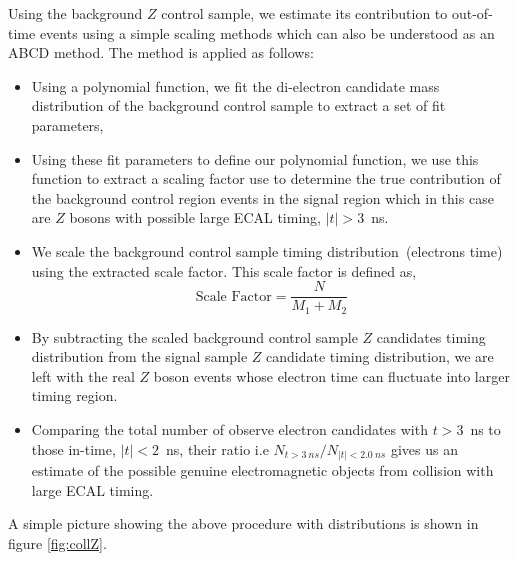 Using the background $Z$ control sample, we estimate its contribution to out-of-time events using a simple scaling methods which can also be understood as an ABCD method. The method is applied as follows:
\begin{itemize}
\item Using a polynomial function, we fit the di-electron candidate mass distribution of the background control sample to extract a set of fit parameters,
\item Using these fit parameters to define our polynomial function, we use this function  to extract a scaling factor use to determine the true contribution of the background control region events in the signal region which in this case are $Z$ bosons with possible large ECAL timing, $|t| > 3$~ns.
\item We scale the background control sample timing distribution~(electrons time) using the extracted scale factor. This scale factor is defined as,   $$\displaystyle{\mbox{Scale Factor} = \frac{N}{M_{1} + M_{2}}}$$
\item By subtracting the scaled background control sample $Z$ candidates timing distribution from the signal sample $Z$ candidate timing distribution, we are left with the real $Z$ boson events whose electron time can fluctuate into larger timing region.
\item Comparing the total number of observe electron candidates with $t > 3$~ns to those  in-time, $|t| < 2$~ns, their ratio i.e $ N_{t > 3~ns}/ N_{|t| < 2.0~ns}$ gives us an estimate of the possible genuine electromagnetic objects from collision with large ECAL timing. 
\end{itemize}  

A simple picture showing the above procedure with distributions is shown in figure \ref{fig:collZ}.

